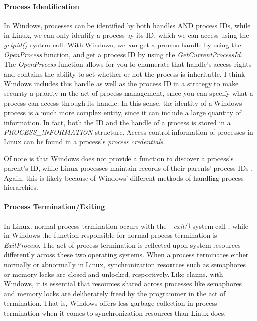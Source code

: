 \documentclass[letterpaper,10pt,titlepage]{article}
\begin{document}
\paragraph{Process Identification} In Windows, processes can be identified by both handles AND process IDs, while in Linux, we can only identify a process by its ID, which we can access using the \emph{getpid()} system call. With Windows, we can get a process handle by using the \emph{OpenProcess} function, and get a process ID by using the \emph{GetCurrentProcessId}. The \emph{OpenProcess} function allows for you to enumerate that handle's access rights and contains the ability to set whether or not the process is inheritable. I think Windows includes this handle as well as the process ID in a strategy to make security a priority in the act of process management, since you can specify what a process can access through its handle. In this sense, the identity of a Windows process is a much more complex entity, since it can include a large quantity of information. In fact, both the ID and the handle of a process is stored in a \emph{PROCESS\_INFORMATION} structure. Access control information of processes in Linux can be found in a process's \emph{process credentials}. 
\par Of note is that Windows does not provide a function to discover a process's parent's ID, while Linux processes maintain records of their parents' process IDs \cite{ker10}. Again, this is likely because of Windows' different methods of handling process hierarchies.  
\paragraph{Process Termination/Exiting}
In Linux, normal process termination occurs with the \emph{\_exit()} system call \cite{ker10}, while in Windows the function responsible for normal process termination is \emph{ExitProcess}.  The act of process termination is reflected upon system resources differently across these two operating systems. When a process terminates either normally or abnormally in Linux, synchronization resources such as semaphores or memory locks are closed and unlocked, respectively. Like \cite{har04} claims, with Windows, it is essential that resources shared across processes like semaphores and memory locks are deliberately freed by the programmer in the act of termination. That is, Windows offers less garbage collection in process termination when it comes to synchronization resources than Linux does. 
\end{document}
